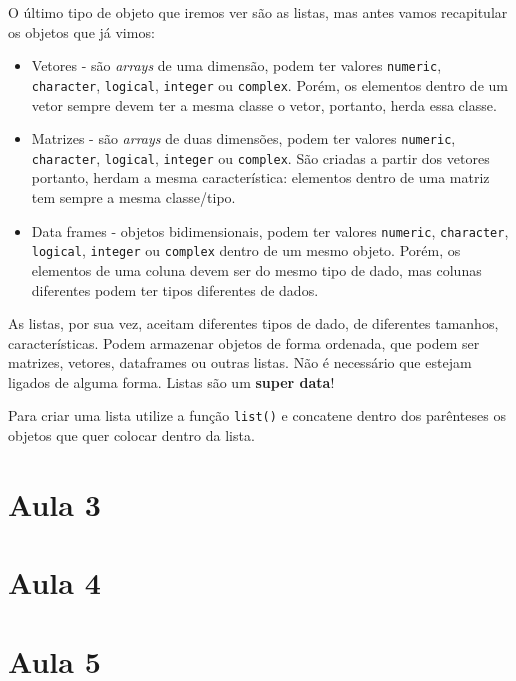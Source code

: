 \documentclass[]{book}
\providecommand{\tightlist}{%
  \setlength{\itemsep}{0pt}\setlength{\parskip}{0pt}}
\theoremstyle{definition}
\theoremstyle{definition}
\theoremstyle{definition}
\theoremstyle{remark}
\begin{document}
O último tipo de objeto que iremos ver são as listas, mas antes vamos recapitular os objetos que já vimos:

\begin{itemize}
\tightlist
\item
  Vetores - são \emph{arrays} de uma dimensão, podem ter valores \texttt{numeric}, \texttt{character}, \texttt{logical}, \texttt{integer} ou \texttt{complex}. Porém, os elementos dentro de um vetor sempre devem ter a mesma classe o vetor, portanto, herda essa classe.
\item
  Matrizes - são \emph{arrays} de duas dimensões, podem ter valores \texttt{numeric}, \texttt{character}, \texttt{logical}, \texttt{integer} ou \texttt{complex}. São criadas a partir dos vetores portanto, herdam a mesma característica: elementos dentro de uma matriz tem sempre a mesma classe/tipo.
\item
  Data frames - objetos bidimensionais, podem ter valores \texttt{numeric}, \texttt{character}, \texttt{logical}, \texttt{integer} ou \texttt{complex} dentro de um mesmo objeto. Porém, os elementos de uma coluna devem ser do mesmo tipo de dado, mas colunas diferentes podem ter tipos diferentes de dados.
\end{itemize}

As listas, por sua vez, aceitam diferentes tipos de dado, de diferentes tamanhos, características. Podem armazenar objetos de forma ordenada, que podem ser matrizes, vetores, dataframes ou outras listas. Não é necessário que estejam ligados de alguma forma. Listas são um \textbf{super data}!

Para criar uma lista utilize a função \texttt{list()} e concatene dentro dos parênteses os objetos que quer colocar dentro da lista.

\hypertarget{aula-3}{%
\chapter{Aula 3}\label{aula-3}}

\hypertarget{aula-4}{%
\chapter{Aula 4}\label{aula-4}}

\hypertarget{aula-5}{%
\chapter{Aula 5}\label{aula-5}}


\end{document}
